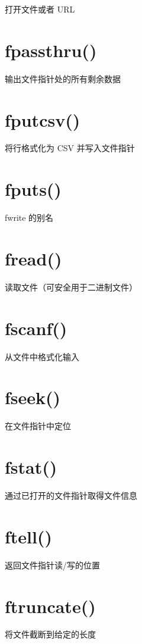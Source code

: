 打开文件或者 URL

\section{fpassthru()}

输出文件指针处的所有剩余数据

\section{fputcsv()}

将行格式化为 CSV 并写入文件指针

\section{fputs()}

fwrite 的别名

\section{fread()}

读取文件（可安全用于二进制文件）

\section{fscanf()}

从文件中格式化输入

\section{fseek()}

在文件指针中定位

\section{fstat()}


通过已打开的文件指针取得文件信息

\section{ftell()}

返回文件指针读/写的位置

\section{ftruncate()}

将文件截断到给定的长度

